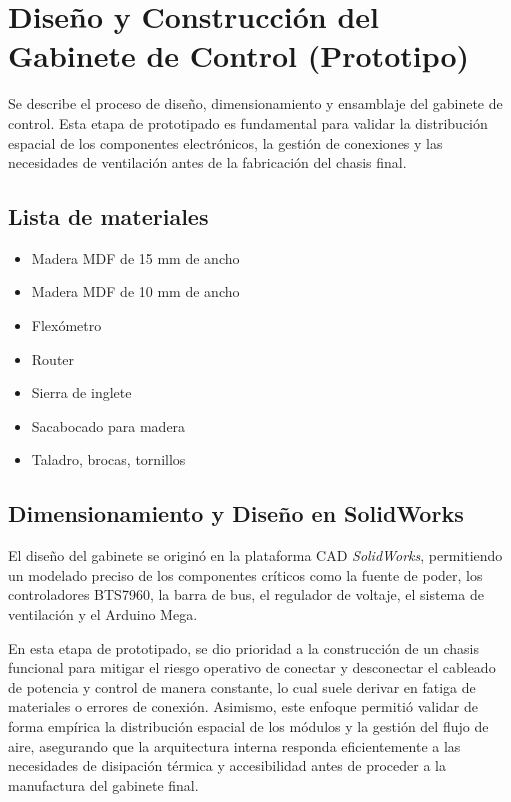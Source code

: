 \chapter{Diseño y Construcción del Gabinete de Control (Prototipo)}
\lineaLateral
\begin{resumenCapitulo}
Se describe el proceso de diseño, dimensionamiento y ensamblaje del gabinete de control. Esta etapa de prototipado es fundamental para validar la distribución espacial de los componentes electrónicos, la gestión de conexiones y las necesidades de ventilación antes de la fabricación del chasis final.
\end{resumenCapitulo}

\section{Lista de materiales}
\begin{itemize}
	\item Madera MDF de 15 mm de ancho
	\item Madera MDF de 10 mm de ancho
	\item Flexómetro
	\item Router
	\item Sierra de inglete
	\item Sacabocado para madera
	\item Taladro, brocas, tornillos
\end{itemize}

\section{Dimensionamiento y Diseño en SolidWorks}

El diseño del gabinete se originó en la plataforma CAD \textit{SolidWorks}, permitiendo un modelado preciso de los componentes críticos como la fuente de poder, los controladores BTS7960, la barra de bus, el regulador de voltaje, el sistema de ventilación y el Arduino Mega. 

En esta etapa de prototipado, se dio prioridad a la construcción de un chasis funcional para mitigar el riesgo operativo de conectar y desconectar el cableado de potencia y control de manera constante, lo cual suele derivar en fatiga de materiales o errores de conexión. Asimismo, este enfoque permitió validar de forma empírica la distribución espacial de los módulos y la gestión del flujo de aire, asegurando que la arquitectura interna responda eficientemente a las necesidades de disipación térmica y accesibilidad antes de proceder a la manufactura del gabinete final.

